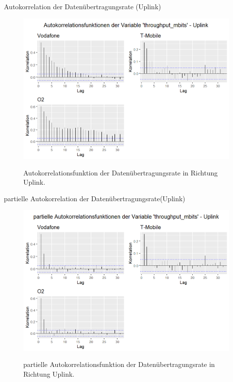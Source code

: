 \begin{frame}{Autokorrelation der Datenübertragungsrate (Uplink)}
	\begin{figure}
		\includegraphics[scale=0.38]{plots/arima/uplink/throughput_acf}\\
		\caption{Autokorrelationsfunktion der Datenübertragungsrate in Richtung Uplink.}
		\label{throughput_acf}
	\end{figure}
\end{frame}

\begin{frame}{partielle Autokorrelation der Datenübertragungsrate(Uplink)}
	\begin{figure}
		\includegraphics[scale=0.38]{plots/arima/uplink/throughput_pacf}\\
		\caption{partielle Autokorrelationsfunktion der Datenübertragungsrate in Richtung Uplink.}
		\label{throughput_pacf}
	\end{figure}
\end{frame}

